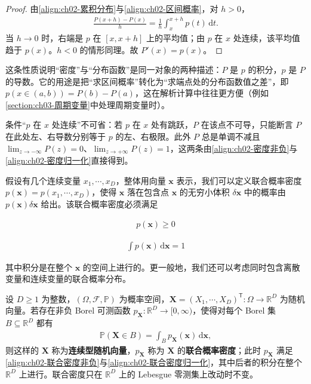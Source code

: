 \documentclass[../../main.tex]{subfiles}
\begin{document}
\begin{proof}
由\eqref{align:ch02-累积分布}与\eqref{align:ch02-区间概率}，对 $h>0$，
\begin{align*}
 \frac{P(x+h)-P(x)}{h} = \frac{1}{h}\int_{x}^{x+h}p(t)\,\mathrm{d}t .
\end{align*}
当 $h\to0$ 时，右端是 $p$ 在 $[x,x+h]$ 上的平均值；由 $p$ 在 $x$ 处连续，该平均值趋于 $p(x)$。$h<0$ 的情形同理。故 $P'(x)=p(x)$。
\end{proof}

\begin{remark}
这条性质说明“密度”与“分布函数”是同一对象的两种描述：$P$ 是 $p$ 的积分，$p$ 是 $P$ 的导数。它的用途是把“求区间概率”转化为“求端点处的分布函数值之差”，即 $p(x\in(a,b))=P(b)-P(a)$，这在解析计算中往往更方便（例如\cref{section:ch03-周期变量}中处理周期变量时）。

条件“$p$ 在 $x$ 处连续”不可省：若 $p$ 在 $x$ 处有跳跃，$P$ 在该点不可导，只能断言 $P$ 在此处左、右导数分别等于 $p$ 的左、右极限。此外 $P$ 总是单调不减且 $\lim_{z\to-\infty}P(z)=0$、$\lim_{z\to+\infty}P(z)=1$，这两条由\eqref{align:ch02-密度非负}与\eqref{align:ch02-密度归一化}直接得到。
\end{remark}

假设有几个连续变量 $x_1,\cdots,x_D$，整体用向量 $\mathbf{x}$ 表示，我们可以定义联合概率密度 $p(\mathbf{x})=p(x_1,\cdots,x_D)$，使得 $\mathbf{x}$ 落在包含点 $\mathbf{x}$ 的无穷小体积 $\delta\mathbf{x}$ 中的概率由 $p(\mathbf{x})\delta\mathbf{x}$ 给出。该联合概率密度必须满足

\begin{align}
  p(\mathbf{x}) \geqslant 0
  \label{align:ch02-联合密度非负}
\end{align}

\begin{align}
  \int p(\mathbf{x})\,\mathrm{d}\mathbf{x} = 1
  \label{align:ch02-联合密度归一化}
\end{align}

其中积分是在整个 $\mathbf{x}$ 的空间上进行的。更一般地，我们还可以考虑同时包含离散变量和连续变量的联合概率分布。

\begin{definition}[联合概率密度]\label{definition:ch02-联合密度}
设 $D\geqslant1$ 为整数，$(\Omega,\mathcal{F},\mathbb{P})$ 为概率空间，$\mathbf{X}=(X_1,\cdots,X_D)^{\mathsf{T}}:\Omega\to\mathbb{R}^{D}$ 为随机向量。若存在非负 Borel 可测函数 $p_{\mathbf{X}}:\mathbb{R}^{D}\to[0,\infty)$，使得对每个 Borel 集 $B\subseteq\mathbb{R}^{D}$ 都有
\begin{align*}
  \mathbb{P}(\mathbf{X}\in B)=\int_B p_{\mathbf{X}}(\mathbf{x})\,\mathrm{d}\mathbf{x},
\end{align*}
则这样的 $\mathbf{X}$ 称为\textbf{连续型随机向量}，$p_{\mathbf{X}}$ 称为 $\mathbf{X}$ 的\textbf{联合概率密度}；此时 $p_{\mathbf{X}}$ 满足\eqref{align:ch02-联合密度非负}与\eqref{align:ch02-联合密度归一化}，其中后者的积分在整个 $\mathbb{R}^{D}$ 上进行。联合密度只在 $\mathbb{R}^{D}$ 上的 Lebesgue 零测集上改动时不变。
\end{definition}
\end{document}
